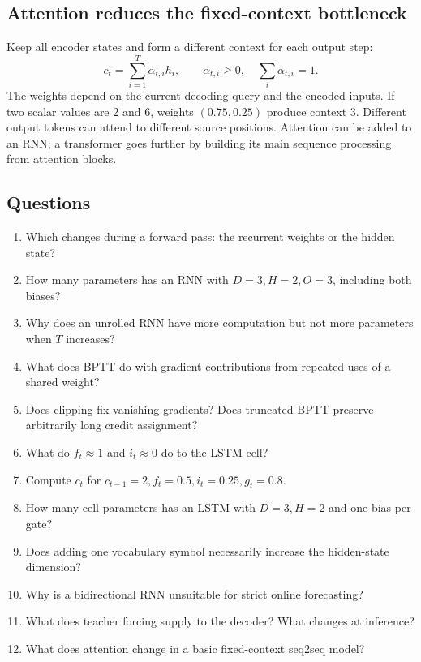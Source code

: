 \documentclass[11pt]{article}
\begin{document}
\subsection{Attention reduces the fixed-context bottleneck}
Keep all encoder states and form a different context for each output step:
\[
c_t=\sum_{i=1}^{T}\alpha_{t,i}h_i,\qquad
\alpha_{t,i}\geq0,\quad \sum_i\alpha_{t,i}=1.
\]
The weights depend on the current decoding query and the encoded inputs. If two scalar values are 2 and 6, weights $(0.75,0.25)$ produce context 3. Different output tokens can attend to different source positions. Attention can be added to an RNN; a transformer goes further by building its main sequence processing from attention blocks.

\subsection{Questions}
\begin{enumerate}
\item Which changes during a forward pass: the recurrent weights or the hidden state?
\item How many parameters has an RNN with $D=3,H=2,O=3$, including both biases?
\item Why does an unrolled RNN have more computation but not more parameters when $T$ increases?
\item What does BPTT do with gradient contributions from repeated uses of a shared weight?
\item Does clipping fix vanishing gradients? Does truncated BPTT preserve arbitrarily long credit assignment?
\item What do $f_t\approx1$ and $i_t\approx0$ do to the LSTM cell?
\item Compute $c_t$ for $c_{t-1}=2,f_t=0.5,i_t=0.25,g_t=0.8$.
\item How many cell parameters has an LSTM with $D=3,H=2$ and one bias per gate?
\item Does adding one vocabulary symbol necessarily increase the hidden-state dimension?
\item Why is a bidirectional RNN unsuitable for strict online forecasting?
\item What does teacher forcing supply to the decoder? What changes at inference?
\item What does attention change in a basic fixed-context seq2seq model?
\end{enumerate}
\end{document}

